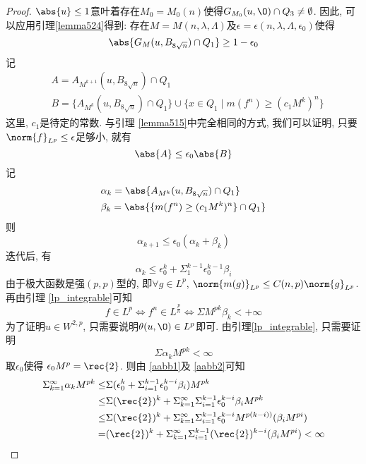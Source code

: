 \begin{proof}
    $\abs{u} \le 1$意叶着存在$M_0=M_0(n)$使得$G_{M_0}(u, \O) \cap Q_3 \ne \emptyset$.  因此, 可以应用引理\eqref{lemma524}得到: 存在$M=M(n, \lambda, \Lambda)$及$\epsilon=\epsilon(n, \lambda, \Lambda, \epsilon_0)$使得
    \begin{equation}
        \abs{G_M(u, B_{8\sqrt{n}})\cap Q_1} \ge 1-\epsilon_0
    \end{equation}
    记
    \begin{align}
        &A=A_{M^{k+1}}(u, B_{8\sqrt{n}}) \cap Q_1 \\
        &B=\{A_{M^{k}}(u, B_{8\sqrt{n}}) \cap Q_1\} \cup \{x\in Q_1 \mid m(f^n) \ge (c_1M^k)^n\}
    \end{align}
    这里, $c_1$是待定的常数.  与引理 \eqref{lemma515}中完全相同的方式, 我们可以证明, 只要$\norm{f}_{L^p} \le \epsilon$足够小, 就有
    \begin{equation}
        \abs{A} \le \epsilon_0\abs{B}
    \end{equation}
    记
    \begin{align}
        &\alpha_k=\abs{A_{M^{k}}(u, B_{8\sqrt{n}}) \cap Q_1} \\
        &\beta_k=\abs{\{m(f^n) \ge (c_1M^k)^n\} \cap Q_1}
    \end{align}
    则 
    \begin{equation}
        \alpha_{k+1} \le \epsilon_0(\alpha_k + \beta_k)
    \end{equation}
    迭代后, 有
    \begin{equation} \label{aabb1}
        \alpha_k \le \epsilon_0^k + \Sigma^{k-1}_{1} \epsilon_0^{k-1}\beta_i
    \end{equation}
    由于极大函数是强$(p, p)$型的, 即$\forall g \in L^p$, $\norm{m(g)}_{L^p} \le C(n, p)\norm{g}_{L^p}$.  再由引理 \eqref{lp_integrable}可知
    \begin{equation}\label{aabb2}
        f \in L^p \iff f^n \in L^{\frac{p }{n}} \iff \Sigma M^{pk}\beta_k < +\infty
    \end{equation}
    为了证明$u \in W^{2, p}$, 只需要说明$\theta(u, \O) \in L^p$即可.  由引理\eqref{lp_integrable}, 只需要证明
    \begin{equation}
        \Sigma \alpha_k M^{pk} < \infty
    \end{equation}
    取$\epsilon_0$使得 $\epsilon_0M^p=\rec{2}$.  则由 \eqref{aabb1}及 \eqref{aabb2}可知 
    \begin{equation}
        \begin{split}
            \Sigma^\infty_{k=1}\alpha_k M^{pk} \le & \Sigma(\epsilon_0^k + \Sigma^{k-1}_{i=1}\epsilon_0^{k-i}\beta_i)M^{pk}\\
            \le & \Sigma (\rec{2})^k+\Sigma_{k=1}^{\infty}\Sigma_{i=1}^{k-1}\epsilon_0^{k-i}\beta_iM^{pk} \\
            \le & \Sigma(\rec{2})^k + \Sigma_{k=1}^{\infty}\Sigma_{i=1}^{k-1}\epsilon_0^{k-i}M^{p(k-i))}(\beta_iM^{pi}) \\
            =& (\rec{2})^k+\Sigma^{\infty}_{k=1}\Sigma^{k-1}_{i=1}(\rec{2})^{k-i}(\beta_i M^{pi}) < \infty
        \end{split}
    \end{equation}
\end{proof}

